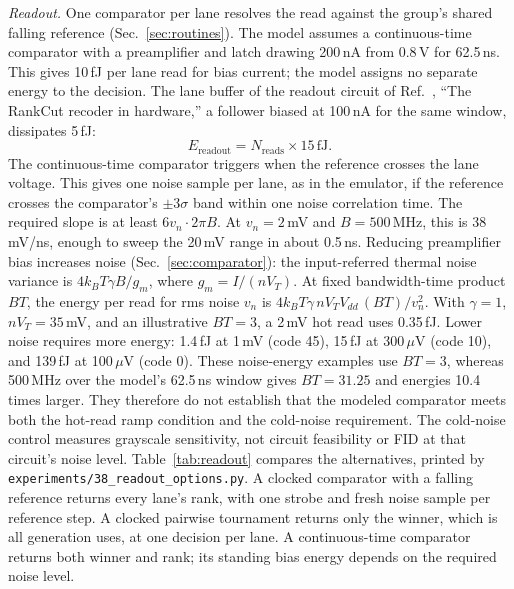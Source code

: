 \documentclass[reprint,amsmath,amssymb,aps,nofootinbib]{revtex4-2}
\newcommand{\kB}{k_{B}}
\begin{document}
\emph{Readout.} One comparator per lane resolves the read against the
group's shared falling reference (Sec.~\ref{sec:routines}). The model assumes a continuous-time comparator with a preamplifier and
latch drawing 200\,nA from 0.8\,V for 62.5\,ns. This gives 10\,fJ per
lane read for bias current; the model assigns no separate energy to the
decision. The lane buffer of the readout circuit of
Ref.~\cite{knowm2026blog}, ``The RankCut recoder in hardware,'' a
follower biased at 100\,nA for the same window, dissipates 5\,fJ:
\begin{equation}
E_{\mathrm{readout}} = N_{\mathrm{reads}} \times 15\,\mathrm{fJ} .
\label{eq:app-readout}
\end{equation}
The continuous-time comparator triggers when the reference crosses the
lane voltage. This gives one noise sample per lane, as in the emulator,
if the reference crosses the comparator's $\pm 3\sigma$ band within one
noise correlation time. The required slope is at least $6 v_n \cdot 2\pi
B$. At $v_n = 2$\,mV and $B = 500$\,MHz, this is 38\,mV/ns, enough to
sweep the 20\,mV range in about 0.5\,ns. Reducing preamplifier bias increases noise (Sec.~\ref{sec:comparator}):
the input-referred thermal noise variance is $4 \kB T \gamma B / g_m$,
where $g_m = I / (n V_T)$. At fixed bandwidth-time product $BT$, the
energy per read for rms noise $v_n$ is $4 \kB T \gamma\, n V_T V_{dd}\,
(BT) / v_n^2$. With $\gamma = 1$, $n V_T = 35$\,mV, and an illustrative
$BT = 3$, a 2\,mV hot read uses 0.35\,fJ. Lower noise requires more
energy: 1.4\,fJ at 1\,mV (code 45), 15\,fJ at 300\,$\mu$V (code 10), and
139\,fJ at 100\,$\mu$V (code 0). These noise-energy examples use $BT=3$, whereas 500\,MHz over the
model's 62.5\,ns window gives $BT=31.25$ and energies 10.4 times
larger. They therefore do not establish that the modeled comparator
meets both the hot-read ramp condition and the cold-noise requirement.
The cold-noise control measures grayscale sensitivity, not circuit
feasibility or FID at that circuit's noise level.
Table~\ref{tab:readout} compares the alternatives, printed by
\texttt{experiments/38\_readout\_options.py}. A clocked comparator with a falling reference returns every lane's
rank, with one strobe and fresh noise sample per reference step.
A clocked pairwise tournament returns only the winner, which is all
generation uses, at one decision per lane. A continuous-time comparator
returns both winner and rank; its standing bias energy depends on the
required noise level.
\end{document}
